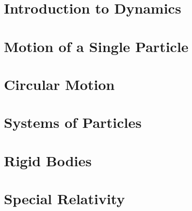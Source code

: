 \documentclass[british,11pt,a4paper]{report}
\begin{document}
\maketitle
\tableofcontents
\chapter{Introduction to Dynamics}

\chapter{Motion of a Single Particle}

\chapter{Circular Motion}
\chapter{Systems of Particles}
\chapter{Rigid Bodies}
\chapter{Special Relativity}
\end{document}
